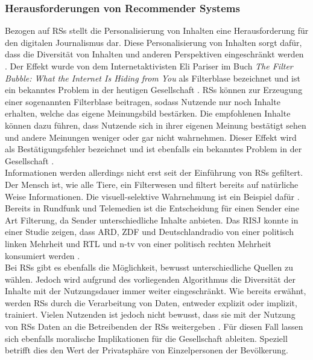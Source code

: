 \subsubsection{Herausforderungen von Recommender Systems}\label{subsec:challenges}
Bezogen auf \acp{RS} stellt die Personalisierung von Inhalten eine Herausforderung für den digitalen Journalismus dar.
Diese Personalisierung von Inhalten sorgt dafür, dass die Diversität von Inhalten und anderen Perspektiven eingeschränkt werden \cite{rundfunk}.
Der Effekt wurde von dem Internetaktivisten Eli Pariser im Buch \textit{The Filter Bubble: What the Internet Is Hiding from You} als Filterblase bezeichnet und ist ein bekanntes Problem in der heutigen Gesellschaft \cite{filter-bubble}.
\acp{RS} können zur Erzeugung einer sogenannten Filterblase beitragen, sodass Nutzende nur noch Inhalte erhalten, welche das eigene Meinungsbild bestärken.
Die empfohlenen Inhalte können dazu führen, dass Nutzende sich in ihrer eigenen Meinung bestätigt sehen und andere Meinungen weniger oder gar nicht wahrnehmen.
Dieser Effekt wird als Bestätigungsfehler bezeichnet und ist ebenfalls ein bekanntes Problem in der Gesellschaft \cite{reasoning-rule}. \\

Informationen werden allerdings nicht erst seit der Einführung von \acp{RS} gefiltert.
Der Mensch ist, wie alle Tiere, ein \glqq Filterwesen\grqq{} und filtert bereits auf natürliche Weise Informationen.
Die visuell-selektive Wahrnehmung ist ein Beispiel dafür \cite{selective-perception}.
Bereits in Rundfunk und Telemedien ist die Entscheidung für einen Sender eine Art Filterung, da Sender unterschiedliche Inhalte anbieten.
Das \ac{RISJ} konnte in einer Studie zeigen, dass ARD, ZDF und Deutschlandradio von einer politisch linken Mehrheit und RTL und n-tv von einer politisch rechten Mehrheit konsumiert werden \cite{public-service-news}.\\

Bei \acp{RS} gibt es ebenfalls die Möglichkeit, bewusst unterschiedliche Quellen zu wählen.
Jedoch wird aufgrund des vorliegenden Algorithmus die Diversität der Inhalte mit der Nutzungsdauer immer weiter eingeschränkt.
Wie bereits erwähnt, werden \acp{RS} durch die Verarbeitung von Daten, entweder explizit oder implizit, trainiert.
Vielen Nutzenden ist jedoch nicht bewusst, dass sie mit der Nutzung von \acp{RS} Daten an die Betreibenden der \acp{RS} weitergeben \cite{privacy-rs}.
Für diesen Fall lassen sich ebenfalls moralische Implikationen für die Gesellschaft ableiten.
Speziell betrifft dies den Wert der Privatsphäre von Einzelpersonen der Bevölkerung.\\

